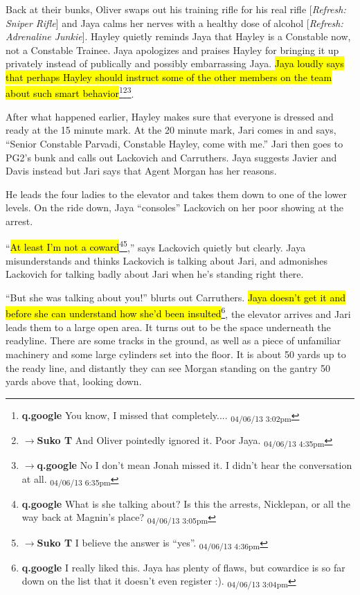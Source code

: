 Back at their bunks, Oliver swaps out his training rifle for his real rifle {[}\textit{Refresh: Sniper Rifle}{]} and Jaya calms her nerves with a healthy dose of alcohol {[}\textit{Refresh: Adrenaline Junkie}{]}.  Hayley quietly reminds Jaya that Hayley is a Constable now, not a Constable Trainee.  Jaya apologizes and praises Hayley for bringing it up privately instead of publically and possibly embarrassing Jaya. \hl{Jaya loudly says that perhaps Hayley should instruct some of the other members on the team about such smart behavior}\footnote{\textbf{q.google }You know, I missed that completely.... \textsubscript{04/06/13 3:02pm}}\footnote{$\rightarrow$\textbf{Suko T }And Oliver pointedly ignored it.  Poor Jaya. \textsubscript{04/06/13 4:35pm}}\footnote{$\rightarrow$\textbf{q.google }No I don't mean Jonah missed it.  I didn't hear the conversation at all. \textsubscript{04/06/13 6:35pm}}.



After what happened earlier, Hayley makes sure that everyone is dressed and ready at the 15 minute mark.  At the 20 minute mark, Jari comes in and says, ``Senior Constable Parvadi, Constable Hayley, come with me.''  Jari then goes to PG2's bunk and calls out Lackovich and Carruthers.  Jaya suggests Javier and Davis instead but Jari says that Agent Morgan has her reasons.



He leads the four ladies to the elevator and takes them down to one of the lower levels.  On the ride down, Jaya ``consoles'' Lackovich on her poor showing at the arrest.  

``\hl{At least I'm not a coward}\footnote{\textbf{q.google }What is she talking about?  Is this the arrests, Nicklepan, or all the way back at Magnin's place? \textsubscript{04/06/13 3:05pm}}\footnote{$\rightarrow$\textbf{Suko T }I believe the answer is ``yes''. \textsubscript{04/06/13 4:36pm}},'' says Lackovich quietly but clearly.  Jaya misunderstands and thinks Lackovich is talking about Jari, and admonishes Lackovich for talking badly about Jari when he's standing right there.  

``But she was talking about you!'' blurts out Carruthers.  \hl{Jaya doesn't get it and before she can understand how she'd been insulted}\footnote{\textbf{q.google }I really liked this.  Jaya has plenty of flaws, but cowardice is so far down on the list that it doesn't even register :). \textsubscript{04/06/13 3:04pm}}, the elevator arrives and Jari leads them to a large open area.  It turns out to be the space underneath the readyline.  There are some tracks in the ground, as well as a piece of unfamiliar machinery and some large cylinders set into the floor.   It is about 50 yards up to the ready line, and distantly they can see Morgan standing on the gantry 50 yards above that, looking down.



